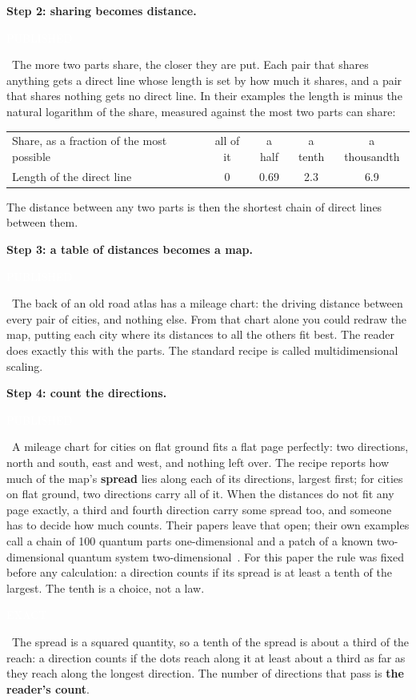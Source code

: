 \documentclass[11pt,letterpaper]{article}
\newcommand{\tagbox}[2]{{\sffamily\scriptsize\colorbox{#1}{\textcolor{white}{\strut #2}}}}
\newcommand{\Exact}{\tagbox{kExact}{EXACT}}
\newcommand{\Pub}{\tagbox{kPub}{PUBLISHED}}
\begin{document}
\textbf{Step 2: sharing becomes distance.} \Pub\ The more two parts share, the closer they are put. Each
pair that shares anything gets a direct line whose length is set by how much it shares, and a pair that
shares nothing gets no direct line. In their examples the length is minus the natural logarithm of the
share, measured against the most two parts can share:

\begin{center}
\renewcommand{\arraystretch}{1.15}
\begin{tabular}{lcccc}
\toprule
Share, as a fraction of the most possible & all of it & a half & a tenth & a thousandth \\
Length of the direct line & 0 & 0.69 & 2.3 & 6.9 \\
\bottomrule
\end{tabular}
\end{center}

The distance between any two parts is then the shortest chain of direct lines between them.

\textbf{Step 3: a table of distances becomes a map.} \Pub\ The back of an old road atlas has a mileage
chart: the driving distance between every pair of cities, and nothing else. From that chart alone you
could redraw the map, putting each city where its distances to all the others fit best. The reader does
exactly this with the parts. The standard recipe is called multidimensional scaling.

\textbf{Step 4: count the directions.} \Pub\ A mileage chart for cities on flat ground fits a flat page
perfectly: two directions, north and south, east and west, and nothing left over. The recipe reports how
much of the map's \textbf{spread} lies along each of its directions, largest first; for cities on flat
ground, two directions carry all of it. When the distances do not fit any page exactly, a third and
fourth direction carry some spread too, and someone has to decide how much counts. Their papers leave
that open; their own examples call a chain of 100 quantum parts one-dimensional and a patch of a known
two-dimensional quantum system two-dimensional~\cite{CCM16}. For this paper the rule was fixed before
any calculation: a direction counts if its spread is at least a tenth of the largest. The tenth is a
choice, not a law. \Exact\ The spread is a squared quantity, so a tenth of the spread is about a third of the
reach: a direction counts if the dots reach along it at least about a third as far as they reach along the
longest direction. The number of directions that pass is \textbf{the reader's count}.
\end{document}
